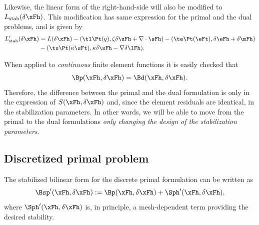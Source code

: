 Likewise, the linear form of the right-hand-side will also be modified to $L_\mathrm{stab}(\delta \xFh)$. This modification has same expression for the primal and the dual problems, and is given by
\begin{align*}
L'_\mathrm{stab}(\delta \xFh)
& = L(\delta \xFh)
- (\tl\Pt(q), \zeta\delta \uFh + \nabla\cdot\sFh) 
- (\te\Pt(\eFt), \delta \eFh + \delta \mFh) \\
& - (\ts\Pt(\kappa\sFt) , \kappa \delta \sFh - \nabla \delta \lFh).
\end{align*}

\begin{remark} When applied to {\emph{continuous}} finite element functions it is easily checked that
$$\Bp(\xFh, \delta \xFh) = \Bd(\xFh, \delta \xFh).$$
Therefore, the difference between the primal and the dual formulation is only in the expression of $S(\xFh, \delta \xFh)$ and, since the element residuals are identical, in the stabilization parameters. In other words, we will be able to move from the primal to the dual formulations \emph{only changing the design of the stabilization parameters}.
\end{remark}

\subsection{Discretized primal problem}

The stabilized bilinear form for the discrete primal formulation can be written as
$$
\Bsp'(\xFh,\delta\xFh) := 
\Bp(\xFh, \delta\xFh)+\Sph'(\xFh, \delta\xFh), 
$$
where $\Sph'(\xFh, \delta\xFh)$ is, in principle, a mesh-dependent term providing the desired stability. 

